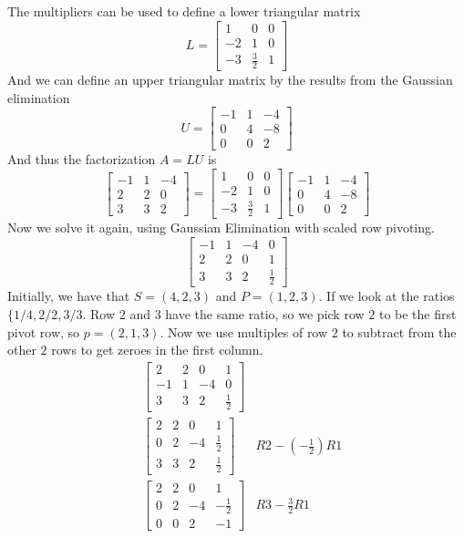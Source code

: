 \documentclass[12pt]{article}
\begin{document}
The multipliers can be used to define a lower triangular matrix
$$
L=
\begin{bmatrix}
1 & 0 & 0 \\
-2 & 1 & 0 \\
-3 & \frac{3}{2} & 1
\end{bmatrix}
$$
And we can define an upper triangular matrix by the results from the Gaussian elimination
$$
U=
\begin{bmatrix}
-1 & 1 & -4 \\
0 & 4 & -8 \\
0 & 0 & 2
\end{bmatrix}
$$
And thus the factorization $A=LU$ is
$$
\begin{bmatrix}
-1 & 1 & -4 \\
2 & 2 & 0 \\
3 & 3 & 2
\end{bmatrix}
=
\begin{bmatrix}
1 & 0 & 0 \\
-2 & 1 & 0 \\
-3 & \frac{3}{2} & 1
\end{bmatrix}
\begin{bmatrix}
-1 & 1 & -4 \\
0 & 4 & -8 \\
0 & 0 & 2
\end{bmatrix}
$$
Now we solve it again, using Gaussian Elimination with scaled row pivoting.
$$
\begin{bmatrix}
-1 & 1 & -4 & 0\\
2 & 2 & 0 & 1\\
3 & 3 & 2 & \frac{1}{2}
\end{bmatrix}
$$
Initially, we have that $S=(4,2,3)$ and $P=(1,2,3)$. If we look at the ratios $\{1/4,2/2,3/3$. Row $2$ and $3$ have the same ratio, so we pick row $2$ to be the first pivot row, so $p=(2,1,3)$. Now we use multiples of row $2$ to subtract from the other $2$ rows to get zeroes in the first column.
\begin{align*}
&\begin{bmatrix}
2 & 2 & 0 & 1\\
-1 & 1 & -4 & 0\\
3 & 3 & 2 & \frac{1}{2}
\end{bmatrix}\\
&\begin{bmatrix}
2 & 2 & 0 & 1\\
0 & 2 & -4 & \frac{1}{2}\\
3 & 3 & 2 & \frac{1}{2}
\end{bmatrix}
&R2-(-\frac{1}{2})R1 \\
&\begin{bmatrix}
2 & 2 & 0 & 1\\
0 & 2 & -4 & -\frac{1}{2}\\
0 & 0 & 2 & -1
\end{bmatrix}
&R3-\frac{3}{2}R1
\end{align*}
\end{document}
